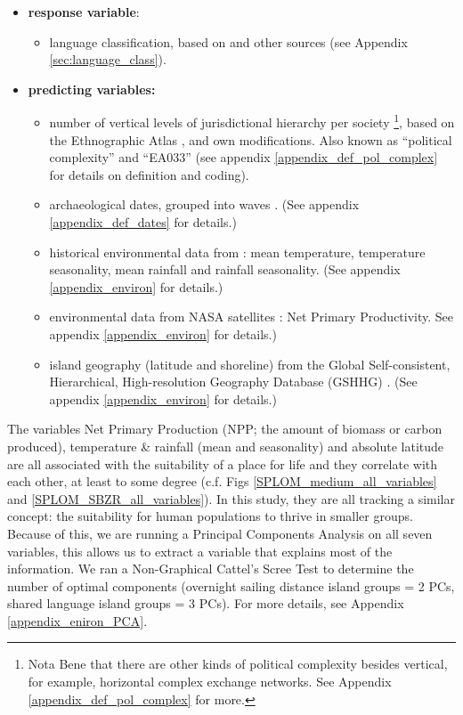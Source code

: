 \documentclass[unnumsec,webpdf,modern,medium]{oup-authoring-template}
\begin{document}
\begin{itemize}
\item \textbf{response variable}:
\begin{itemize}
\item language classification, based on \citet{glottolog40} and other sources (see Appendix \ref{sec:language_class}).
\end{itemize}
\item \textbf{predicting variables:}
\begin{itemize}
\item number of vertical levels of jurisdictional hierarchy per society \footnote{Nota Bene that there are other kinds of political complexity besides vertical, for example, horizontal complex exchange networks. See Appendix \ref{appendix_def_pol_complex} for more.}, based on the Ethnographic Atlas \citep{gray1998ethnographic, d_place_all}, \citet{sheehan2018coevolution} and own modifications. Also known as ``political complexity'' and ``EA033'' (see appendix \ref{appendix_def_pol_complex} for details on definition and coding).
\item archaeological dates, grouped into waves \citep{intoh2007reconnaissance, intoh2008ongoing, rieth_cochrane_2018, levin_seikel_miles_2019, pol_outliers_stat_art, Napolitano_et_al_yap}. (See appendix \ref{appendix_def_dates} for details.)
\item historical environmental data from \citet{ecoclimate}: mean temperature, temperature seasonality, mean rainfall and rainfall seasonality. (See appendix \ref{appendix_environ} for details.)
\item environmental data from NASA satellites \citep{running2021modis_aqua, running2021modis_terra}: Net Primary Productivity. See appendix \ref{appendix_environ} for details.)
\item island geography (latitude and shoreline) from the Global Self-consistent, Hierarchical, High-resolution Geography Database (GSHHG) \citep{wessel1996global}.  (See appendix \ref{appendix_environ} for details.)
\end{itemize}
\end{itemize}

The variables Net Primary Production (NPP; the amount of biomass or carbon produced), temperature \& rainfall (mean and seasonality) and absolute latitude are all associated with the suitability of a place for life and they correlate with each other, at least to some degree (c.f. Figs \ref{SPLOM_medium_all_variables} and \ref{SPLOM_SBZR_all_variables}). In this study, they are all tracking a similar concept: the suitability for human populations to thrive in smaller groups. Because of this, we are running a Principal Components Analysis on all seven variables, this allows us to extract a variable that explains most of the information. We ran a Non-Graphical Cattel's Scree Test \citep{cattell1966scree, R-nFactors} to determine the number of optimal components (overnight sailing distance island groups = 2 PCs, shared language island groups = 3 PCs). For more details, see Appendix \ref{appendix_eniron_PCA}.
\end{document}
